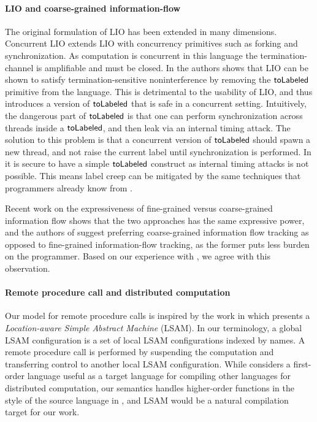 \paragraph{LIO and coarse-grained information-flow}
The original formulation of LIO \cite{SRMMlio} has been extended in many dimensions. Concurrent LIO \cite{Stefan:2012:ACT:2364527.2364557} extends LIO with concurrency primitives such as forking and synchronization. As computation is concurrent in this language the termination-channel is amplifiable and must be closed. In \cite{Stefan:2012:ACT:2364527.2364557} the authors shows that LIO can be shown to satisfy termination-sensitive noninterference by removing the $\mathsf{toLabeled}$ primitive from the language. This is detrimental to the usability of LIO, and thus \cite{Stefan:2012:ACT:2364527.2364557} introduces a version of $\mathsf{toLabeled}$ that is safe in a concurrent setting. Intuitively, the dangerous part of $\mathsf{toLabeled}$ is that one can perform synchronization across threads inside a $\mathsf{toLabeled}$, and then leak via an internal timing attack. The solution to this problem is that a concurrent version of $\mathsf{toLabeled}$ should spawn a new thread, and not raise the current label until synchronization is performed. In \lang{} it is secure to have a simple $\mathsf{toLabeled}$ construct as internal timing attacks is not possible. This means label creep can be mitigated by the same techniques that programmers already know from \cite{SRMMlio}.

Recent work \cite{Rajani:2017:TSI:3051528.3051531} on the expressiveness of fine-grained versus coarse-grained information flow shows that the two approaches has the same expressive power, and the authors of \cite{Rajani:2017:TSI:3051528.3051531} suggest preferring coarse-grained information flow tracking as opposed to fine-grained information-flow tracking, as the former puts less burden on the programmer. Based on our experience with \lang{}, we agree with this observation.

\paragraph{Remote procedure call and distributed computation}
Our model for remote procedure calls is inspired by the work in \cite{10.1007/978-3-642-25462-8_28} which presents a \emph{Location-aware Simple Abstract Machine} (LSAM). In our terminology, a global LSAM configuration is a set of local LSAM configurations indexed by names. A remote procedure call is performed by suspending the computation and transferring control to another local LSAM configuration. While \cite{10.1007/978-3-642-25462-8_28} considers a first-order language useful as a target language for compiling other languages for distributed computation, our semantics handles higher-order functions in the style of the source language in \cite{Cooper:2009:RC:1599410.1599439}, and LSAM would be a natural compilation target for our work.